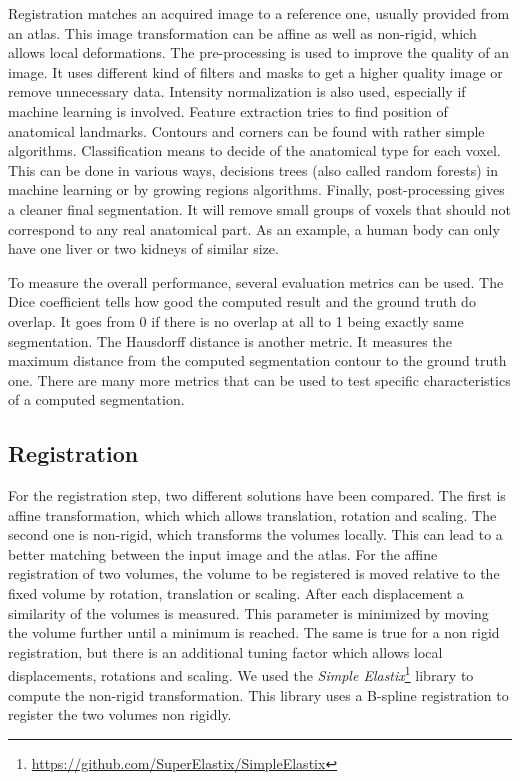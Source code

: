 Registration matches an acquired image to a reference one, usually provided from an atlas. This image transformation can be affine as well as non-rigid, which allows local deformations. The pre-processing is used to improve the quality of an image. It uses different kind of filters and masks to get a higher quality image or remove unnecessary data. Intensity normalization is also used, especially if machine learning is involved. Feature extraction tries to find position of anatomical landmarks. Contours and corners can be found with rather simple algorithms. Classification means to decide of the anatomical type for each voxel. This can be done in various ways, decisions trees (also called random forests) in machine learning or by growing regions algorithms. Finally, post-processing gives a cleaner final segmentation. It will remove small groups of voxels that should not correspond to any real anatomical part. As an example, a human body can only have one liver or two kidneys of similar size.

To measure the overall performance, several evaluation metrics can be used. The Dice coefficient tells how good the computed result and the ground truth do overlap. It goes from 0 if there is no overlap at all to 1 being exactly same segmentation. The Hausdorff distance is another metric. It measures the maximum distance from the computed segmentation contour to the ground truth one. There are many more metrics that can be used to test specific characteristics of a computed segmentation.

\subsection*{Registration}
For the registration step, two different solutions have been compared. The first is affine transformation, which which allows translation, rotation and scaling. The second one is non-rigid, which transforms the volumes locally. This can lead to a better matching between the input image and the atlas. For the affine registration of two volumes, the volume to be registered is moved relative to the fixed volume by rotation, translation or scaling. After each displacement a similarity of the volumes is measured. This parameter is minimized by moving the volume further until a minimum is reached. The same is true for a non rigid registration, but there is an additional tuning factor which allows local displacements, rotations and scaling. We used the \textit{Simple Elastix}\footnote{\url{https://github.com/SuperElastix/SimpleElastix}} library to compute the non-rigid transformation. This library uses a B-spline registration to register the two volumes non rigidly.

